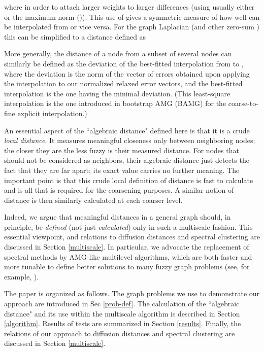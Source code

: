 \documentclass[final]{siamltex}
\begin{document}
where  in order to attach larger weights to larger differences (using usually either  or the maximum norm ()). This use of  gives a symmetric measure of how well
 can be interpolated from  or vice versa.
For the graph Laplacian (and other zero-sum ) this can
be simplified to a distance defined as


More generally, the distance of a node  from a subset  of
several nodes can similarly be defined as the deviation of the
best-fitted interpolation from  to , where the deviation
is the  norm of the vector of  errors obtained upon
applying the interpolation to our  normalized relaxed error
vectors, and the best-fitted interpolation is the one having the
minimal deviation. (This least-square interpolation is the one
introduced in bootstrap AMG (BAMG) \cite{amg} for the coarse-to-fine explicit
interpolation.)

An essential aspect of the ``algebraic distance" defined here is
that it is a crude {\it local distance}. It measures
meaningful closeness only between neighboring nodes; the closer
they are the less fuzzy is their measured distance. For nodes that
should not be considered as neighbors, their algebraic distance
just detects the fact that they are far apart; its exact value carries
no further meaning. The important point is that this crude local
definition of distance is fast to calculate and is all
that is required for the coarsening purposes. A similar notion of
distance is then similarly calculated at each coarser level.

Indeed, we argue that meaningful distances in a general graph
should, in principle, be {\it defined} (not just {\it calculated})
only in such a multiscale fashion. This essential viewpoint, and
relations to diffusion distances and spectral clustering are
discussed in Section \ref{multiscale}. In particular, we
advocate the replacement of spectral methods by AMG-like
multilevel algorithms, which are both faster and more tunable to
define better solutions to many fuzzy graph problems
(see, for example, \cite{safro2004,safro2005}).

The paper is organized as follows. The graph problems we use to
demonstrate our approach are introduced in Sec \ref{prob-def}. The
calculation of the ``algebraic distance" and its use within the
multiscale algorithm is described in Section \ref{algorithm}. Results of tests
are summarized in Section \ref{results}. Finally, the
relations of our approach to diffusion distances and spectral
clustering are discussed in Section \ref{multiscale}.
\end{document}
